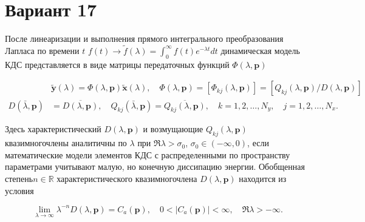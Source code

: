 \documentclass{article}
\begin{document}
\section*{Вариант 17}

После линеаризации и выполнения прямого интегрального преобразования Лапласа по времени $t$ $f(t) \rightarrow \tilde{f}(\lambda) = \int_0^\infty f(t)e^{-\lambda t} dt$ динамическая модель КДС представляется в виде матрицы передаточных функций $\Phi(\lambda, \mathbf{p})$


\begin{equation}
\begin{aligned}
        &\mathbf{\tilde{y}}(\lambda) = \Phi(\lambda, \mathbf{p})\mathbf{\tilde{x}}(\lambda),\quad
        \Phi(\lambda, \mathbf{p}) = [\Phi_{kj}(\lambda, \mathbf{p})] = [Q_{kj}(\lambda, \mathbf{p})/D(\lambda, \mathbf{p})] \\
        D(\bar{\lambda},\mathbf{p}) &= \overline{D(\lambda, \mathbf{p})}, \quad
        Q_{kj}(\bar{\lambda},\mathbf{p}) = \overline{Q_{kj}(\lambda, \mathbf{p})}, \quad
        k = 1,2,\dots,N_y, \quad
        j = 1,2,\dots,N_x.
\end{aligned}
\end{equation}

Здесь характеристический $D(\lambda, \mathbf{p})$ и возмущающие $Q_{kj}(\lambda, \mathbf{p})$ квазимногочлены аналитичны по $\lambda$ при $\Re\lambda > \sigma_0$, $\sigma_0 \in (-\infty, 0)$, если математические модели элементов КДС с распределенными по пространству параметрами учитывают малую, но конечную диссипацию энергии. Обобщенная степень$n \in \mathbb{R}$ характеристического квазимногочлена $D(\lambda, \mathbf{p})$ находится из условия

\begin{equation}
        \lim_{\lambda \to \infty}\lambda^{-n}D(\lambda, \mathbf{p}) = C_a(\mathbf{p}), \quad
        0 < |C_a(\mathbf{p})| < \infty, \quad
        \Re\lambda>-\infty.
\end{equation}
\end{document}
